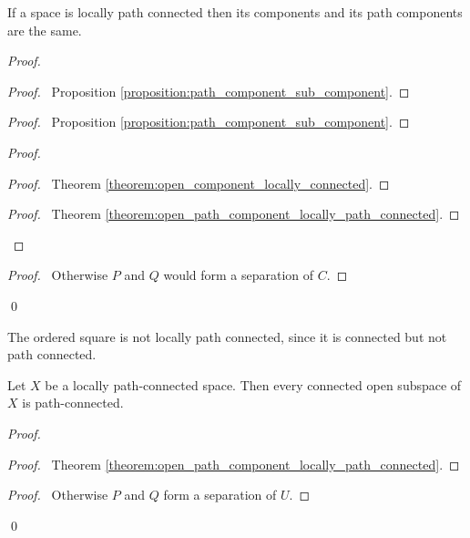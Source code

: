 \begin{theorem}
    If a space is locally path connected then its components and its path components are the same.
\end{theorem}

\begin{proof}
    \pf
    \begin{proof}
        \pf\ Proposition \ref{proposition:path_component_sub_component}.
    \end{proof}
    \begin{proof}
        \pf\ Proposition \ref{proposition:path_component_sub_component}.
    \end{proof}
    \begin{proof}
        \begin{proof}
            \pf\ Theorem \ref{theorem:open_component_locally_connected}.
        \end{proof}
        \qedstep
        \begin{proof}
            \pf\ Theorem \ref{theorem:open_path_component_locally_path_connected}.
        \end{proof}
    \end{proof}
    \begin{proof}
        \pf\ Otherwise $P$ and $Q$ would form a separation of $C$.
    \end{proof}
    \qed
\end{proof}

\begin{example}
    The ordered square is not locally path connected, since it is connected but not path connected.
\end{example}

\begin{proposition}
    Let $X$ be a locally path-connected space. Then every connected open subspace
    of $X$ is path-connected.
\end{proposition}

\begin{proof}
    \pf
    \begin{proof}
        \pf\ Theorem \ref{theorem:open_path_component_locally_path_connected}.
    \end{proof}
    \begin{proof}
        \pf\ Otherwise $P$ and $Q$ form a separation of $U$.
    \end{proof}
    \qed
\end{proof}

